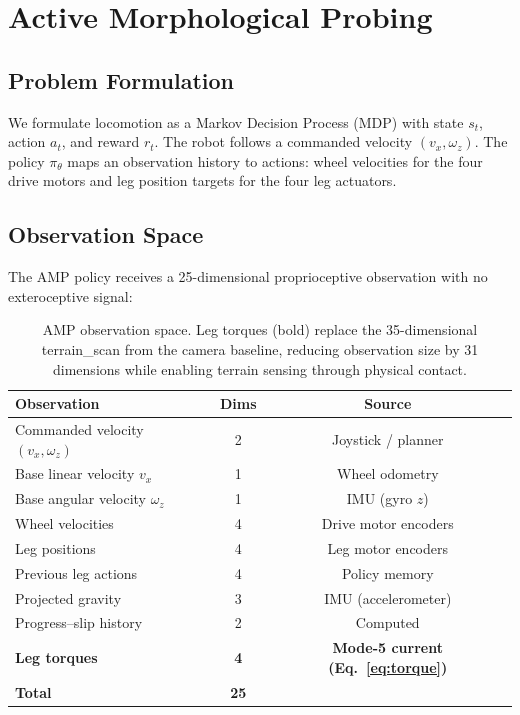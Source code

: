 \documentclass{article}
\begin{document}

\section{Active Morphological Probing}
\label{sec:method}

\subsection{Problem Formulation}

We formulate locomotion as a Markov Decision Process (MDP) with state $s_t$, action
$a_t$, and reward $r_t$. The robot follows a commanded velocity $(v_x, \omega_z)$. The
policy $\pi_\theta$ maps an observation history to actions: wheel velocities for the four
drive motors and leg position targets for the four leg actuators.

\subsection{Observation Space}

The AMP policy receives a 25-dimensional proprioceptive observation with no exteroceptive
signal:

\begin{table}[h]
\centering
\small
\begin{tabular}{lcc}
\toprule
Observation & Dims & Source \\
\midrule
Commanded velocity $(v_x, \omega_z)$ & 2 & Joystick / planner \\
Base linear velocity $v_x$ & 1 & Wheel odometry \\
Base angular velocity $\omega_z$ & 1 & IMU (gyro $z$) \\
Wheel velocities & 4 & Drive motor encoders \\
Leg positions & 4 & Leg motor encoders \\
Previous leg actions & 4 & Policy memory \\
Projected gravity & 3 & IMU (accelerometer) \\
Progress--slip history & 2 & Computed \\
\textbf{Leg torques} & \textbf{4} & \textbf{Mode-5 current (Eq.~\ref{eq:torque})} \\
\midrule
\textbf{Total} & \textbf{25} & \\
\bottomrule
\end{tabular}
\caption{AMP observation space. Leg torques (bold) replace the 35-dimensional
terrain\_scan from the camera baseline, reducing observation size by 31 dimensions while
enabling terrain sensing through physical contact.}
\label{tab:obs}
\end{table}
\end{document}
